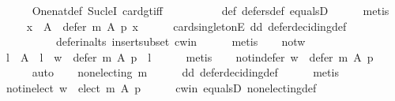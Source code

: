 \begin{isabellebody}
\ \ \ \ \isamarkupfalse%
\ One{\isacharunderscore}{\kern0pt}nat{\isacharunderscore}{\kern0pt}def\ Suc{\isacharunderscore}{\kern0pt}leI\ card{\isacharunderscore}{\kern0pt}gt{\isacharunderscore}{\kern0pt}{}{\isacharunderscore}{\kern0pt}iff\isanewline
\ \ \ \ \ \ \ \ \ \ def{\isacharunderscore}{\kern0pt}{}\ defers{\isacharunderscore}{\kern0pt}def\ equals{}D\isanewline
\ \ \ \ \isamarkupfalse%
\ metis\isanewline
\ \ \isamarkupfalse%
\ {}{\isacharcolon}{\kern0pt}\ {\isachardoublequoteopen}{\isasymexists}x\ {\isasymin}\ A\ {\isachardot}{\kern0pt}\ defer\ m\ A\ p\ {\isacharequal}{\kern0pt}{\isacharbraceleft}{\kern0pt}x{\isacharbraceright}{\kern0pt}{\isachardoublequoteclose}\isanewline
\ \ \ \ \isamarkupfalse%
\ card{\isacharunderscore}{\kern0pt}{}{\isacharunderscore}{\kern0pt}singletonE\ dd\ defer{\isacharunderscore}{\kern0pt}deciding{\isacharunderscore}{\kern0pt}def\isanewline
\ \ \ \ \ \ \ \ \ \ defer{\isacharunderscore}{\kern0pt}in{\isacharunderscore}{\kern0pt}alts\ insert{\isacharunderscore}{\kern0pt}subset\ c{\isacharunderscore}{\kern0pt}win\isanewline
\ \ \ \ \isamarkupfalse%
\ metis\isanewline
\ \ \isamarkupfalse%
\ not{\isacharunderscore}{\kern0pt}w\ \isamarkupfalse%
\ {\isachardoublequoteopen}{\isasymexists}l\ {\isasymin}\ A\ {\isachardot}{\kern0pt}\ l\ {\isasymnoteq}\ w\ {\isasymand}\ defer\ m\ A\ p\ {\isacharequal}{\kern0pt}\ {\isacharbraceleft}{\kern0pt}l{\isacharbraceright}{\kern0pt}{\isachardoublequoteclose}\isanewline
\ \ \ \ \isamarkupfalse%
\ metis\isanewline
\ \ \isamarkupfalse%
\ not{\isacharunderscore}{\kern0pt}in{\isacharunderscore}{\kern0pt}defer{\isacharcolon}{\kern0pt}\ {\isachardoublequoteopen}w\ {\isasymnotin}\ defer\ m\ A\ p{\isachardoublequoteclose}\isanewline
\ \ \ \ \isamarkupfalse%
\ auto\isanewline
\ \ \isamarkupfalse%
\ {\isachardoublequoteopen}non{\isacharunderscore}{\kern0pt}electing\ m{\isachardoublequoteclose}\isanewline
\ \ \ \ \isamarkupfalse%
\ dd\ defer{\isacharunderscore}{\kern0pt}deciding{\isacharunderscore}{\kern0pt}def\isanewline
\ \ \ \ \isamarkupfalse%
\ metis\isanewline
\ \ \isamarkupfalse%
\ not{\isacharunderscore}{\kern0pt}in{\isacharunderscore}{\kern0pt}elect{\isacharcolon}{\kern0pt}\ {\isachardoublequoteopen}w\ {\isasymnotin}\ elect\ m\ A\ p{\isachardoublequoteclose}\isanewline
\ \ \ \ \isamarkupfalse%
\ c{\isacharunderscore}{\kern0pt}win\ equals{}D\ non{\isacharunderscore}{\kern0pt}electing{\isacharunderscore}{\kern0pt}def\isanewline

\end{isabellebody}
